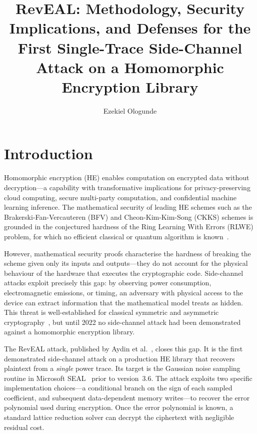 \documentclass[sigconf,nonacm]{acmart}
\title{RevEAL: Methodology, Security Implications, and Defenses for the First Single-Trace Side-Channel Attack on a Homomorphic Encryption Library}
\author{Ezekiel Ologunde}
\affiliation{\institution{Independent Researcher}\city{Boston}\state{MA}\country{USA}}
\begin{document}
\hfuzz=5pt
\maketitle

\section{Introduction}

Homomorphic encryption (HE) enables computation on encrypted data without
decryption---a capability with transformative implications for privacy-preserving
cloud computing, secure multi-party computation, and confidential machine learning
inference. The mathematical security of leading HE schemes such as the
Brakerski-Fan-Vercauteren (BFV) and Cheon-Kim-Kim-Song (CKKS) schemes is grounded
in the conjectured hardness of the Ring Learning With Errors (RLWE) problem, for
which no efficient classical or quantum algorithm is known~\cite{brakerski2012,fan2012}.

However, mathematical security proofs characterise the hardness of breaking the
scheme given only its inputs and outputs---they do not account for the physical
behaviour of the hardware that executes the cryptographic code. Side-channel attacks
exploit precisely this gap: by observing power consumption, electromagnetic emissions,
or timing, an adversary with physical access to the device can extract information
that the mathematical model treats as hidden. This threat is well-established for
classical symmetric and asymmetric cryptography~\cite{kocher1999,messerges2000}, but
until 2022 no side-channel attack had been demonstrated against a homomorphic
encryption library.

The RevEAL attack, published by Aydin et al.~\cite{aydin2022reveal}, closes this gap.
It is the first demonstrated side-channel attack on a production HE library that
recovers plaintext from a \emph{single} power trace. Its target is the Gaussian
noise sampling routine in Microsoft SEAL~\cite{sealcrypto} prior to version~3.6.
The attack exploits two specific implementation choices---a conditional branch on the
sign of each sampled coefficient, and subsequent data-dependent memory writes---to
recover the error polynomial used during encryption. Once the error polynomial is
known, a standard lattice reduction solver can decrypt the ciphertext with negligible
residual cost.
\end{document}
